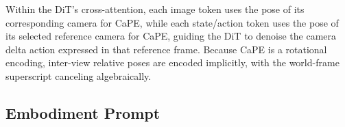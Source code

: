 
Within the DiT's cross-attention, each image token uses the pose of its corresponding camera for CaPE, while each state/action token uses the pose of its selected reference camera for CaPE, guiding the DiT to denoise the camera delta action expressed in that reference frame.
Because CaPE is a rotational encoding, inter-view relative poses are encoded implicitly, with the world-frame superscript canceling algebraically.


\subsection{Embodiment Prompt}



